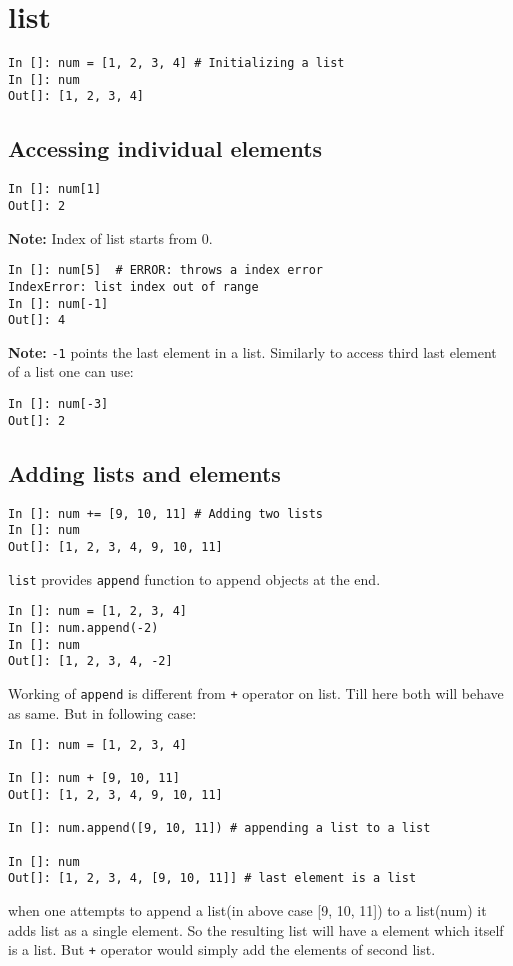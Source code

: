 \documentclass[12pt]{article}
\newcommand{\typ}[1]{\lstinline{#1}}
\begin{document}
\section{list}
\begin{lstlisting}
In []: num = [1, 2, 3, 4] # Initializing a list
In []: num
Out[]: [1, 2, 3, 4]
\end{lstlisting}
\subsection{Accessing individual elements}
\begin{lstlisting}
In []: num[1]
Out[]: 2  
\end{lstlisting}
\textbf{Note:} Index of list starts from 0.
\begin{lstlisting}
In []: num[5]  # ERROR: throws a index error
IndexError: list index out of range
In []: num[-1]
Out[]: 4
\end{lstlisting}
\textbf{Note: }\typ{-1} points the last element in a list. Similarly to access third last element of a list one can use: 
\begin{lstlisting}
In []: num[-3]
Out[]: 2  
\end{lstlisting}
\subsection{Adding lists and elements}
\begin{lstlisting}
In []: num += [9, 10, 11] # Adding two lists
In []: num
Out[]: [1, 2, 3, 4, 9, 10, 11]
\end{lstlisting}
\typ{list} provides \typ{append} function to append objects at the end. 
\begin{lstlisting}
In []: num = [1, 2, 3, 4] 
In []: num.append(-2) 
In []: num
Out[]: [1, 2, 3, 4, -2]
\end{lstlisting}
Working of \typ{append} is different from \typ{+} operator on list. Till here both will behave as same. But in following case:
\begin{lstlisting}
In []: num = [1, 2, 3, 4]

In []: num + [9, 10, 11]
Out[]: [1, 2, 3, 4, 9, 10, 11]

In []: num.append([9, 10, 11]) # appending a list to a list

In []: num
Out[]: [1, 2, 3, 4, [9, 10, 11]] # last element is a list
\end{lstlisting}
when one attempts to append a list(in above case [9, 10, 11]) to a list(num) it adds list as a single element. So the resulting list will have a element which itself is a list. But \typ{+} operator would simply add the elements of second list.\\
\end{document}
